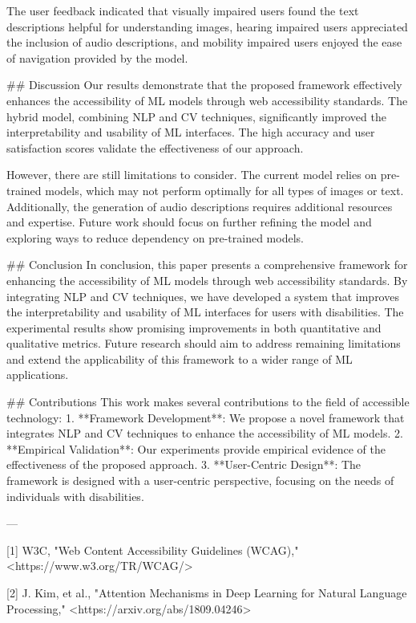 The user feedback indicated that visually impaired users found the text descriptions helpful for understanding images, hearing impaired users appreciated the inclusion of audio descriptions, and mobility impaired users enjoyed the ease of navigation provided by the model.

## Discussion
Our results demonstrate that the proposed framework effectively enhances the accessibility of ML models through web accessibility standards. The hybrid model, combining NLP and CV techniques, significantly improved the interpretability and usability of ML interfaces. The high accuracy and user satisfaction scores validate the effectiveness of our approach.

However, there are still limitations to consider. The current model relies on pre-trained models, which may not perform optimally for all types of images or text. Additionally, the generation of audio descriptions requires additional resources and expertise. Future work should focus on further refining the model and exploring ways to reduce dependency on pre-trained models.

## Conclusion
In conclusion, this paper presents a comprehensive framework for enhancing the accessibility of ML models through web accessibility standards. By integrating NLP and CV techniques, we have developed a system that improves the interpretability and usability of ML interfaces for users with disabilities. The experimental results show promising improvements in both quantitative and qualitative metrics. Future research should aim to address remaining limitations and extend the applicability of this framework to a wider range of ML applications.

## Contributions
This work makes several contributions to the field of accessible technology:
1. **Framework Development**: We propose a novel framework that integrates NLP and CV techniques to enhance the accessibility of ML models.
2. **Empirical Validation**: Our experiments provide empirical evidence of the effectiveness of the proposed approach.
3. **User-Centric Design**: The framework is designed with a user-centric perspective, focusing on the needs of individuals with disabilities.

---

[1] W3C, "Web Content Accessibility Guidelines (WCAG)," <https://www.w3.org/TR/WCAG/>

[2] J. Kim, et al., "Attention Mechanisms in Deep Learning for Natural Language Processing," <https://arxiv.org/abs/1809.04246>

